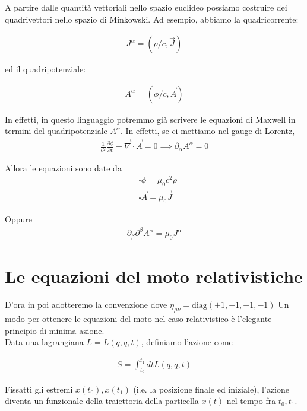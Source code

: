 \documentclass{report}
\begin{document}
A partire dalle quantità vettoriali nello spazio euclideo possiamo costruire dei quadrivettori nello spazio di Minkowski. Ad esempio, abbiamo la quadricorrente: 

\begin{align}
    J^\alpha = (\rho/c, \vec{J})
\end{align}

ed il quadripotenziale: 

\begin{align}
    A^{\alpha} = (\phi/c, \vec{A})
\end{align}

In effetti, in questo linguaggio potremmo già scrivere le equazioni di Maxwell in termini del quadripotenziale \(A^\alpha\). In effetti, se ci mettiamo nel gauge di Lorentz, 
\begin{align}
    \frac{1}{c^2}\frac{\partial \phi}{\partial t} + \vec{\nabla}\cdot \vec{A} = 0 \implies \partial_\alpha A^\alpha =0
\end{align}

Allora le equazioni sono date da 
\begin{align}
    & \square \phi = \mu_0 c^2 \rho \\
    & \square \vec{A} = \mu_0 \vec{J}
\end{align}

Oppure 
\begin{align}
    \partial_\beta \partial^\beta A^\alpha = \mu_0 J^\alpha
\end{align}

\section{Le equazioni del moto relativistiche}

D'ora in poi adotteremo la convenzione dove \(\eta_{\mu \nu} = \text{diag}(+1, -1, -1, -1)\)
Un modo per ottenere le equazioni del moto nel caso relativistico è l'elegante principio di minima azione. \\
Data una lagrangiana \( L = L(q, \dot{q}, t)\), definiamo l'azione come 

\begin{align}
    S = \int_{t_0}^{t_1}dt L(q, \dot{q}, t)
\end{align}

Fissatti gli estremi \(x(t_0), x(t_1)\) (i.e. la posizione finale ed iniziale), l'azione diventa un funzionale della traiettoria della particella \(x(t)\) nel tempo fra \( t_0, t_1\). \\
\end{document}
